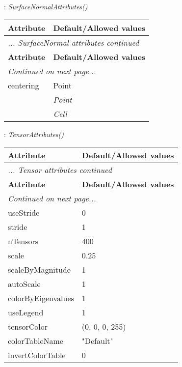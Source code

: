 \documentclass[10pt,a4paper]{report}
\begin{document}
\newpage

{}
: {\it SurfaceNormalAttributes() }\\[-3mm]

\begin{longtable}{ll}
{\bf Attribute} & {\bf Default/Allowed values} \\
\hline \hline
\endfirsthead
\multicolumn{2}{l}{{\it ... SurfaceNormal attributes continued}} \\
{\bf Attribute} & {\bf Default/Allowed values} \\
\hline \hline
\endhead
\hline
\multicolumn{2}{l}{{\it Continued on next page...}} \\
\endfoot
\hline
\endlastfoot

centering  &  Point   \\
 & {\it  Point} \\
 & {\it  Cell} \\
\end{longtable}

\newpage

{}
: {\it TensorAttributes() }\\[-3mm]

\begin{longtable}{ll}
{\bf Attribute} & {\bf Default/Allowed values} \\
\hline \hline
\endfirsthead
\multicolumn{2}{l}{{\it ... Tensor attributes continued}} \\
{\bf Attribute} & {\bf Default/Allowed values} \\
\hline \hline
\endhead
\hline
\multicolumn{2}{l}{{\it Continued on next page...}} \\
\endfoot
\hline
\endlastfoot

useStride  &  0 \\
stride  &  1 \\
nTensors  &  400 \\
scale  &  0.25 \\
scaleByMagnitude  &  1 \\
autoScale  &  1 \\
colorByEigenvalues  &  1 \\
useLegend  &  1 \\
tensorColor  &  (0, 0, 0, 255) \\
colorTableName  &  "Default" \\
invertColorTable  &  0 \\
\end{longtable}
\end{document}
